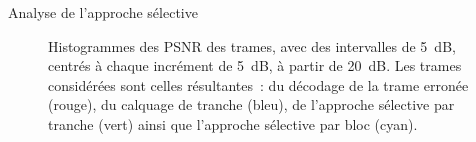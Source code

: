 \begin{section}{Analyse de l'approche sélective}
\begin{figure}
	\caption[Histogrammes des PSNR des trames] {Histogrammes des PSNR des trames,
avec des intervalles de 5~dB, centrés à chaque incrément de 5~dB, à partir de 20~dB. Les trames considérées sont
celles résultantes~: du décodage de la trame erronée (rouge), du calquage de
tranche (bleu), de l'approche sélective par tranche (vert) ainsi que
l'approche sélective par bloc (cyan).} 
	\label{fig-FrameDistribution}
\end{figure}


\end{section}
